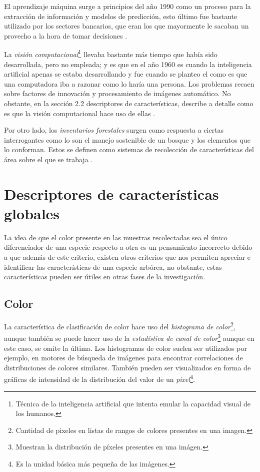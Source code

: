 El aprendizaje máquina surge a principios del año 1990 como un proceso para la extracción de información y modelos de predicción, esto último fue bastante utilizado por los sectores bancarios, que eran los que mayormente le sacaban un provecho a la hora de tomar decisiones \citep{rf5}. 

La \emph{visión computacional}\footnote{Técnica de la inteligencia artificial que intenta emular la capacidad visual de los humanos.} llevaba bastante más tiempo que había sido desarrollada, pero no empleada; y es que en el año 1960 es cuando la inteligencia artificial apenas se estaba desarrollando y fue cuando se planteo el como es que una computadora iba a razonar como lo haría una persona. Los problemas recaen sobre factores de innovación y procesamiento de imágenes automático. No obstante, en la sección 2.2 descriptores de características, describe a detalle como es que la visión computacional hace uso de ellas \citep{rf6}.

Por otro lado, los \emph{inventarios forestales} surgen como respuesta a ciertas interrogantes como lo son el manejo sostenible de un bosque y los elementos que lo conforman. Estos se definen como sistemas de recolección de características del área sobre el que se trabaja \citep{rf7}.

\section{Descriptores de características globales}
La idea de que el color presente en las muestras recolectadas sea el único diferenciador de una especie respecto a otra es un pensamiento incorrecto debido a que además de este criterio, existen otros criterios que nos permiten apreciar e identificar las características de una especie arbórea, no obstante, estas características pueden ser útiles en otras fases de la investigación. 

\subsection{Color}
La característica de clasificación de color hace uso del \emph{histograma de color}\footnote{Cantidad de pixeles en listas de rangos de colores presentes en una imagen.}, aunque también se puede hacer uso de la \emph{estadística de canal de color}\footnote{Muestran la distribución de píxeles presentes en una imágen.} aunque en este caso, se omite la última. Los histogramas de color suelen ser utilizados por ejemplo, en motores de búsqueda de imágenes para encontrar correlaciones de distribuciones de colores similares. También pueden ser visualizados en forma de gráficas de intensidad de la distribución del valor de un \emph{pixel}\footnote{Es la unidad básica más pequeña de las imágenes.}.

